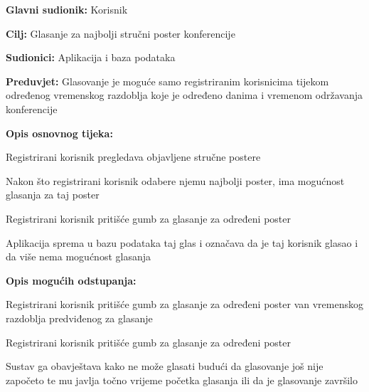 				\noindent {}
				\begin{packed_item}

					\item \textbf{Glavni sudionik: }Korisnik
					\item  \textbf{Cilj:} Glasanje za najbolji stručni poster konferencije
					\item  \textbf{Sudionici:} Aplikacija i baza podataka
					\item  \textbf{Preduvjet:} Glasovanje je moguće samo registriranim korisnicima tijekom određenog vremenskog razdoblja koje je određeno danima i vremenom održavanja konferencije
					\item  \textbf{Opis osnovnog tijeka:}

					\item[] \begin{packed_enum}

						\item Registrirani korisnik pregledava objavljene stručne postere
						\item Nakon što registrirani korisnik odabere njemu najbolji poster, ima mogućnost glasanja za taj poster
						\item Registrirani korisnik pritišće gumb za glasanje za određeni poster
						\item Aplikacija sprema u bazu podataka taj glas i označava da je taj korisnik glasao i da više nema mogućnost glasanja

					\end{packed_enum}

					\item  \textbf{Opis mogućih odstupanja:}

					\item[] \begin{packed_item}

						\item[3.a] Registrirani korisnik pritišće gumb za glasanje za određeni poster van vremenskog razdoblja predviđenog za glasanje
						\item[] \begin{packed_enum}

							\item Registrirani korisnik pritišće gumb za glasanje za određeni poster
							\item Sustav ga obavještava kako ne može glasati budući da glasovanje još nije započeto te mu javlja točno vrijeme početka glasanja ili da je glasovanje završilo


\end{packed_enum}
\end{packed_item}
\end{packed_item}
